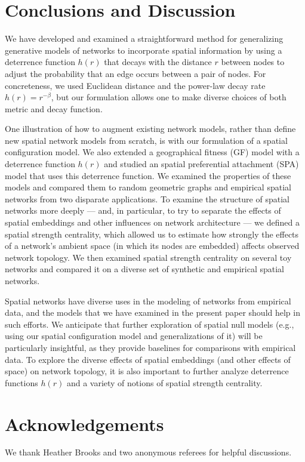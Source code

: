 \documentclass[%
 reprint,
 amsmath,amssymb,
 aps,
]{revtex4-1}
\begin{document}

\section{Conclusions and Discussion} \label{sec:discussion}

We have developed and examined a straightforward method for generalizing generative models of networks to incorporate spatial information by using a deterrence function $h(r)$ that decays with the distance $r$ between nodes to adjust the probability that an edge occurs between a pair of nodes. For concreteness, we used Euclidean distance and the power-law decay rate $h(r) = r^{-\beta}$, but our formulation allows one to make diverse choices of both metric and decay function. 

One illustration of how to augment existing network models, rather than define new spatial network models from scratch, is with our formulation of a spatial configuration model. We also extended a geographical fitness (GF) model with a deterrence function $h(r)$ and studied an spatial preferential attachment (SPA) model that uses this deterrence function. We examined the properties of these models and compared them to random geometric graphs and empirical spatial networks from two disparate applications. To examine the structure of spatial networks more deeply --- and, in particular, to try to separate the effects of spatial embeddings and other influences on network architecture --- we defined a spatial strength centrality, which allowed us to estimate how strongly the effects of a network's ambient space (in which its nodes are embedded) affects observed network topology. We then examined spatial strength centrality on several toy networks and compared it on a diverse set of synthetic and empirical spatial networks.

Spatial networks have diverse uses in the modeling of networks from empirical data, and the models that we have examined in the present paper should help in such efforts. We anticipate that further exploration of spatial null models (e.g., using our spatial configuration model and generalizations of it) will be particularly insightful, as they provide baselines for comparisons with empirical data. To explore the diverse effects of spatial embeddings (and other effects of space) on network topology, it is also important to further analyze deterrence functions $h(r)$ and a variety of notions of spatial strength centrality.




\section*{Acknowledgements}

We thank Heather Brooks and two anonymous referees for helpful discussions.





%
\end{document}
